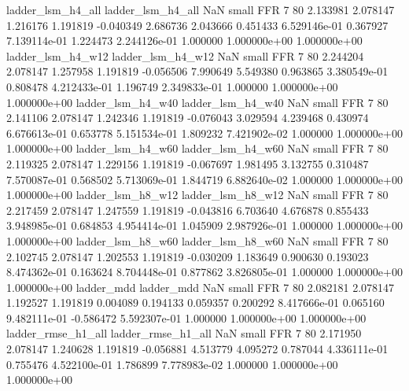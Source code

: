        ladder_lsm_h4_all        ladder_lsm_h4_all                   NaN      small      FFR                 7 80 2.133981       2.078147 1.216176       1.191819   -0.040349      2.686736      2.043666     0.451433   6.529146e-01  0.367927 7.139114e-01     1.224473   2.244126e-01            1.000000    1.000000e+00        1.000000e+00
       ladder_lsm_h4_w12        ladder_lsm_h4_w12                   NaN      small      FFR                 7 80 2.244204       2.078147 1.257958       1.191819   -0.056506      7.990649      5.549380     0.963865   3.380549e-01  0.808478 4.212433e-01     1.196749   2.349833e-01            1.000000    1.000000e+00        1.000000e+00
       ladder_lsm_h4_w40        ladder_lsm_h4_w40                   NaN      small      FFR                 7 80 2.141106       2.078147 1.242346       1.191819   -0.076043      3.029594      4.239468     0.430974   6.676613e-01  0.653778 5.151534e-01     1.809232   7.421902e-02            1.000000    1.000000e+00        1.000000e+00
       ladder_lsm_h4_w60        ladder_lsm_h4_w60                   NaN      small      FFR                 7 80 2.119325       2.078147 1.229156       1.191819   -0.067697      1.981495      3.132755     0.310487   7.570087e-01  0.568502 5.713069e-01     1.844719   6.882640e-02            1.000000    1.000000e+00        1.000000e+00
       ladder_lsm_h8_w12        ladder_lsm_h8_w12                   NaN      small      FFR                 7 80 2.217459       2.078147 1.247559       1.191819   -0.043816      6.703640      4.676878     0.855433   3.948985e-01  0.684853 4.954414e-01     1.045909   2.987926e-01            1.000000    1.000000e+00        1.000000e+00
       ladder_lsm_h8_w60        ladder_lsm_h8_w60                   NaN      small      FFR                 7 80 2.102745       2.078147 1.202553       1.191819   -0.030209      1.183649      0.900630     0.193023   8.474362e-01  0.163624 8.704448e-01     0.877862   3.826805e-01            1.000000    1.000000e+00        1.000000e+00
              ladder_mdd               ladder_mdd                   NaN      small      FFR                 7 80 2.082181       2.078147 1.192527       1.191819    0.004089      0.194133      0.059357     0.200292   8.417666e-01  0.065160 9.482111e-01    -0.586472   5.592307e-01            1.000000    1.000000e+00        1.000000e+00
      ladder_rmse_h1_all       ladder_rmse_h1_all                   NaN      small      FFR                 7 80 2.171950       2.078147 1.240628       1.191819   -0.056881      4.513779      4.095272     0.787044   4.336111e-01  0.755476 4.522100e-01     1.786899   7.778983e-02            1.000000    1.000000e+00        1.000000e+00
